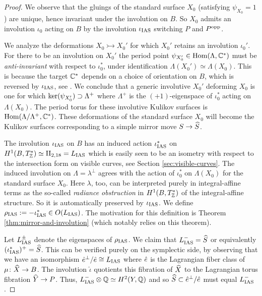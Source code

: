 \documentclass{amsart}
\begin{document}
  \begin{proof} We observe that the gluings of the
  standard surface $X_0$ (satisfying $\psi_{X_0}=1$)
  are unique, hence invariant under the involution on $B$.
  So $X_0$ admits an involution $\iota_0$ acting on $B$
  by the involution $\iota_{\rm IAS}$ switching $P$ and $P^{\rm opp}$.
  
  We analyze
  the deformations $X_0\rightarrowtail X_0'$ for which $X_0'$
  retains an involution $\iota_0'$. For there to be an involution on $X_0'$ 
  the period point $\psi_{X_0'}\in  \operatorname{Hom}(\Lambda,{\mathbb C}^*)$
  must be {\it anti-invariant} with respect to $\iota_0^*$, under identification
  $\Lambda(X_0')\simeq \Lambda(X_0)$.
This is because the target ${\mathbb C}^*$ depends on a choice of orientation
on $B$, which is reversed by $\iota_{\rm IAS}$, see \cite[Sec.~6G]{alexeev2019stable-pair}.
We conclude that a generic involutive $X_0'$ deforming $X_0$
is one for which ${\rm ker}(\psi_{X_0'})\supset \Lambda^+$
where $\Lambda^+$ is the $(+1)$-eigenspace of $\iota_0^*$ acting 
on $\Lambda(X_0)$. The period torus for these involutive Kulikov surfaces
is ${\rm Hom}(\Lambda/\Lambda^+,{\mathbb C}^*)$. These deformations of the standard
surface $X_0$ will become the Kulikov surfaces corresponding to a simple mirror move $S\to {\widehat S}$.

The involution $\iota_{\rm IAS}$ on $B$ has an induced action $\iota_{\rm IAS}^*$
on $H^1(B,T_{\mathbb Z}^*)\simeq {\rm II}_{2,18}=L_{\rm IAS}$ which is easily
seen to be an isometry with respect to the intersection form
\cite[Ex.~7.27]{alexeev2020compactifications-moduli}
on visible curves, see Section \ref{sec:visible-curves}.
The induced involution on $\Lambda = \lambda^\perp$ agrees
with the action of $\iota_0^*$ on $\Lambda(X_0)$ for the standard surface
$X_0$. Here $\lambda$, too, can be interpreted purely in integral-affine terms
as the so-called {\it radiance obstruction}
in $H^1(B,T_{\mathbb Z}^*)$ of the integral-affine structure. So it
is automatically preserved by $\iota_{\rm IAS}$.
We define $\rho_{\rm IAS}:=-\iota_{\rm IAS}^*\in O(L_{\rm IAS})$. The motivation
for this definition is Theorem \ref{thm:mirror-and-involution}
(which notably relies
on this theorem).

Let $L_{\rm IAS}^{\pm}$ denote the eigenspaces of $\rho_{\rm IAS}$.
We claim that $L_{\rm IAS}^-={\widehat S}$ or equivalently $(\iota_{\rm IAS}^*)^+={\widehat S}$.
This can be verified purely on the symplectic 
side, by observing that we have an isomorphism $\hat e^\perp/\hat e\cong L_{\rm IAS}$
where $\hat e$ is the Lagrangian fiber class of $\mu\colon {\widehat X}\to B$. 
The involution $\hat{\iota}$ quotients this fibration of ${\widehat X}$ to 
the Lagrangian torus fibration ${\widehat Y}\to P$. Thus, $L_{\rm IAS}^-\otimes {\mathbb Q}\simeq H^2(Y,{\mathbb Q})$
and so ${\widehat S} \subset \hat e^\perp/\hat e$ must equal $L_{\rm IAS}^-$.


\end{proof}
\end{document}
